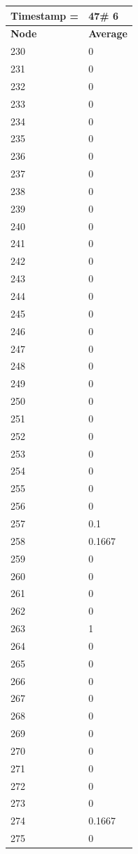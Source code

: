 \begin{tabular}{|l||l|}
\hline
\textbf{Timestamp =} & \textbf{47}\# 6\\\hline
	\textbf{Node} & \textbf{Average} \\ \hline
\hline
	230 & 0 \\ \hline
	231 & 0 \\ \hline
	232 & 0 \\ \hline
	233 & 0 \\ \hline
	234 & 0 \\ \hline
	235 & 0 \\ \hline
	236 & 0 \\ \hline
	237 & 0 \\ \hline
	238 & 0 \\ \hline
	239 & 0 \\ \hline
	240 & 0 \\ \hline
	241 & 0 \\ \hline
	242 & 0 \\ \hline
	243 & 0 \\ \hline
	244 & 0 \\ \hline
	245 & 0 \\ \hline
	246 & 0 \\ \hline
	247 & 0 \\ \hline
	248 & 0 \\ \hline
	249 & 0 \\ \hline
	250 & 0 \\ \hline
	251 & 0 \\ \hline
	252 & 0 \\ \hline
	253 & 0 \\ \hline
	254 & 0 \\ \hline
	255 & 0 \\ \hline
	256 & 0 \\ \hline
	257 & 0.1 \\ \hline
	258 & 0.1667 \\ \hline
	259 & 0 \\ \hline
	260 & 0 \\ \hline
	261 & 0 \\ \hline
	262 & 0 \\ \hline
	263 & 1 \\ \hline
	264 & 0 \\ \hline
	265 & 0 \\ \hline
	266 & 0 \\ \hline
	267 & 0 \\ \hline
	268 & 0 \\ \hline
	269 & 0 \\ \hline
	270 & 0 \\ \hline
	271 & 0 \\ \hline
	272 & 0 \\ \hline
	273 & 0 \\ \hline
	274 & 0.1667 \\ \hline
	275 & 0 \\ \hline
\end{tabular}

